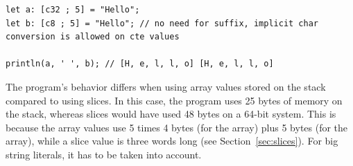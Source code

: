 \begin{lstlisting}[style=coloredverbatim]
let a: [c32 ; 5] = "Hello";
let b: [c8 ; 5] = "Hello"; // no need for suffix, implicit char conversion is allowed on cte values

println(a, ' ', b); // [H, e, l, l, o] [H, e, l, l, o]
\end{lstlisting}

The program's behavior differs when using array values stored on the stack
compared to using slices. In this case, the program uses 25 bytes of memory on
the stack, whereas slices would have used 48 bytes on a 64-bit system. This is
because the array values use 5 times 4 bytes (for the  array) plus 5
bytes (for the  array), while a slice value is three words long (see
Section~\ref{sec:slices}). For big string literals, it has to be taken into
account.

\vfill%
\pagebreak
